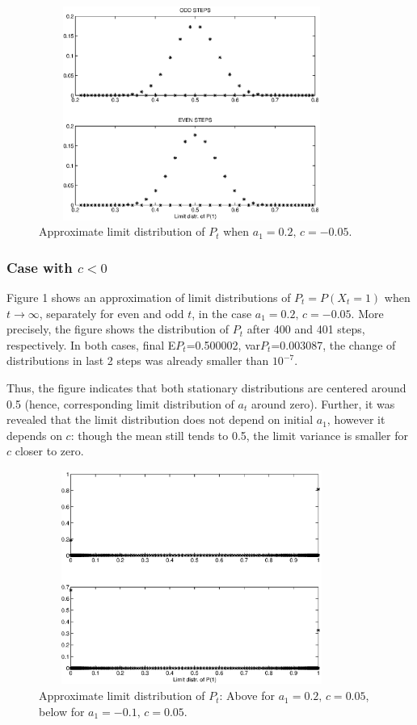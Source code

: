 \documentclass[11pt]{article}
\begin{document}
\begin{figure}[h]
\centering
    \includegraphics[width = 10cm,height=7cm]{vyvoj_s_punish.eps}
\caption{Approximate limit distribution of $P_t$ when $a_1=0.2,\,
c=-0.05$.}
\end{figure}

\subsubsection{Case with $c<0$}

Figure 1 shows an approximation of limit distributions of $P_t =P(X_t=1)$ when $t\to\infty$, separately for 
even and odd $t$, in the case $a_1=0.2,\, c=-0.05$. More precisely, the figure shows the distribution of $P_t$ after
400 and 401 steps, respectively. In both cases, final E$P_t$=0.500002, var$P_t$=0.003087, the change of distributions in last 2 steps was already smaller than $10^{-7}$.

Thus, the figure indicates that both stationary distributions are centered around 0.5 
(hence, corresponding limit distribution of $a_t$ around zero). Further, 
it was revealed that the limit distribution does not depend on
initial $a_1$, however it depends on $c$: though the mean still tends to 0.5,
the limit variance is smaller for $c$ closer to zero.

\begin{figure}[h]
\centering
    \includegraphics[width = 10cm,height=7cm]{vyvoj_s_reward.eps}
\caption{Approximate limit distribution of $P_t$: Above for
$a_1=0.2,\, c=0.05$, below for $a_1=-0.1,\, c=0.05$.}
\end{figure}
\end{document}
